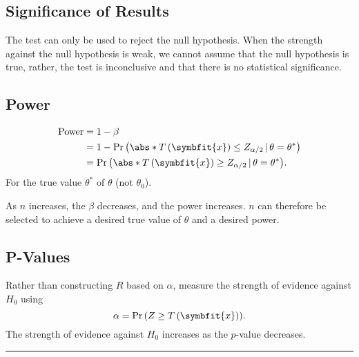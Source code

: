 \documentclass{article}
\begin{document}
\begin{multicols}{3}
    \subsection{Significance of Results}
    The test can only be used to reject the null hypothesis.
    When the strength against the null hypothesis is weak, we cannot assume that the null
    hypothesis is true, rather, the test is inconclusive and that there is no statistical significance.
    \subsection{Power}
    \begin{align*}
        \operatorname{Power} & = 1 - \beta                                                                                                   \\
                             & = 1 - \Pr{\left( \abs*{T\left( \symbfit{x} \right)} \leq Z_{\alpha/2} \,\vert\, \theta = \theta^\ast \right)} \\
                             & = \Pr{\left( \abs*{T\left( \symbfit{x} \right)} \geq Z_{\alpha/2} \,\vert\, \theta = \theta^\ast \right)}.
    \end{align*}
    For the true value \(\theta^\ast\) of \(\theta\) (not \(\theta_0\)).

    As \(n\) increases, the \(\beta\) decreases, and the power increases.
    \(n\) can therefore be selected to achieve a desired true value of \(\theta\) and a desired power.
    \subsection{P-Values}
    Rather than constructing \(R\) based on \(\alpha\), measure the strength of evidence
    against \(H_0\) using
    \begin{equation*}
        \alpha = \Pr{\left( Z \geq T\left( \symbfit{x} \right) \right)}.
    \end{equation*}
    The strength of evidence against \(H_0\) increases as the \(p\)-value decreases.
\end{multicols}
\hrule
\end{document}
